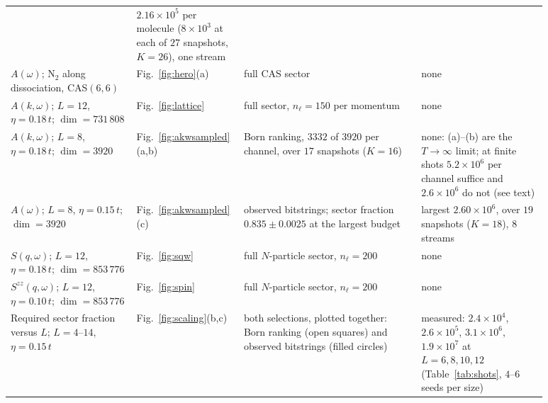 \begin{table}[tp]
\begin{tabular}{@{}p{0.225\linewidth}p{0.115\linewidth}p{0.315\linewidth}p{0.225\linewidth}@{}}
 & \raggedright $2.16\times10^{5}$ per molecule ($8\times10^{3}$ at each of $27$ snapshots, $K{=}26$), one stream\tabularnewline
\raggedright $A(\omega)$; $\mathrm{N_2}$ along dissociation, CAS$(6,6)$
 & \raggedright Fig.~\ref{fig:hero}(a)
 & \raggedright full CAS sector
 & \raggedright none\tabularnewline
\midrule
\raggedright $A(k,\omega)$; $L{=}12$, $\eta{=}0.18\,t$; $\dim=731\,808$
 & \raggedright Fig.~\ref{fig:lattice}
 & \raggedright full sector, $n_\ell=150$ per momentum
 & \raggedright none\tabularnewline
\raggedright $A(k,\omega)$; $L{=}8$, $\eta{=}0.18\,t$; $\dim=3920$
 & \raggedright Fig.~\ref{fig:akwsampled}(a,b)
 & \raggedright Born ranking, $3332$ of $3920$ per channel, over $17$ snapshots ($K{=}16$)
 & \raggedright none: (a)--(b) are the $T\to\infty$ limit; at finite shots $5.2\times10^{6}$ per channel
   suffice and $2.6\times10^{6}$ do not (see text)\tabularnewline
\raggedright $A(\omega)$; $L{=}8$, $\eta{=}0.15\,t$; $\dim=3920$
 & \raggedright Fig.~\ref{fig:akwsampled}(c)
 & \raggedright observed bitstrings; sector fraction $0.835\pm0.0025$ at the largest budget
 & \raggedright largest $2.60\times10^{6}$, over $19$ snapshots ($K{=}18$), $8$ streams\tabularnewline
\midrule
\raggedright $S(q,\omega)$; $L{=}12$, $\eta{=}0.18\,t$; $\dim=853\,776$
 & \raggedright Fig.~\ref{fig:sqw}
 & \raggedright full $N$-particle sector, $n_\ell=200$
 & \raggedright none\tabularnewline
\raggedright $S^{zz}(q,\omega)$; $L{=}12$, $\eta{=}0.10\,t$; $\dim=853\,776$
 & \raggedright Fig.~\ref{fig:spin}
 & \raggedright full $N$-particle sector, $n_\ell=200$
 & \raggedright none\tabularnewline
\midrule
\raggedright Required sector fraction versus $L$; $L{=}4$--$14$, $\eta{=}0.15\,t$
 & \raggedright Fig.~\ref{fig:scaling}(b,c)
 & \raggedright both selections, plotted together: Born ranking (open squares) and observed bitstrings (filled
   circles)
 & \raggedright measured: $2.4\times10^{4}$, $2.6\times10^{5}$, $3.1\times10^{6}$, $1.9\times10^{7}$ at
   $L=6,8,10,12$ (Table~\ref{tab:shots}, $4$--$6$ seeds per size)\tabularnewline
\bottomrule
\end{tabular}
\end{table}

